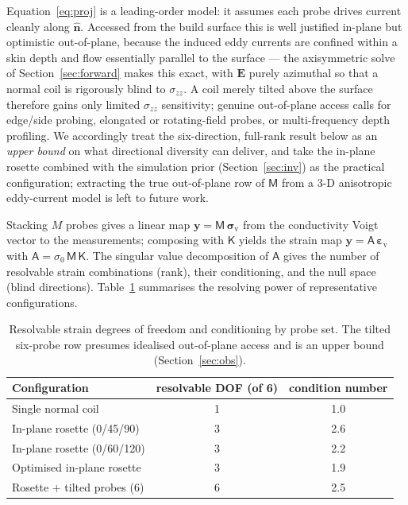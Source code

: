 \documentclass[11pt]{article}
\newcommand{\eps}{\bm{\varepsilon}}
\newcommand{\Kt}{\mathsf{K}}
\begin{document}
Equation~\eqref{eq:proj} is a leading-order model: it assumes each probe drives
current cleanly along $\hat{\bm n}$. Accessed from the build surface this is well
justified in-plane but optimistic out-of-plane, because the induced eddy currents
are confined within a skin depth and flow essentially parallel to the surface ---
the axisymmetric solve of Section~\ref{sec:forward} makes this exact, with $\bm E$
purely azimuthal so that a normal coil is rigorously blind to $\sigma_{zz}$. A
coil merely tilted above the surface therefore gains only limited $\sigma_{zz}$
sensitivity; genuine out-of-plane access calls for edge/side probing, elongated or
rotating-field probes, or multi-frequency depth profiling. We accordingly treat
the six-direction, full-rank result below as an \emph{upper bound} on what
directional diversity can deliver, and take the in-plane rosette combined with the
simulation prior (Section~\ref{sec:inv}) as the practical configuration;
extracting the true out-of-plane row of $\mathsf M$ from a 3-D anisotropic
eddy-current model is left to future work.

Stacking $M$ probes gives a linear map
$\bm y = \mathsf{M}\,\bm\sigma_{\mathrm{v}}$ from the conductivity Voigt vector to
the measurements; composing with $\Kt$ yields the
strain map $\bm y = \mathsf{A}\,\eps_{\mathrm v}$ with
$\mathsf{A}=\sigma_0\,\mathsf{M}\,\Kt$. The singular value decomposition of
$\mathsf A$ gives the number of resolvable strain combinations (rank), their
conditioning, and the null space (blind directions). Table~\ref{tab:obs}
summarises the resolving power of representative configurations.

\begin{table}[t]
\centering
\caption{Resolvable strain degrees of freedom and conditioning by probe set. The
tilted six-probe row presumes idealised out-of-plane access and is an upper bound
(Section~\ref{sec:obs}).}
\label{tab:obs}
\begin{tabular}{lcc}
\toprule
Configuration & resolvable DOF (of 6) & condition number\\
\midrule
Single normal coil          & 1 & 1.0\\
In-plane rosette (0/45/90)   & 3 & 2.6\\
In-plane rosette (0/60/120)  & 3 & 2.2\\
Optimised in-plane rosette   & 3 & 1.9\\
Rosette + tilted probes (6)  & 6 & 2.5\\
\bottomrule
\end{tabular}
\end{table}
\end{document}
